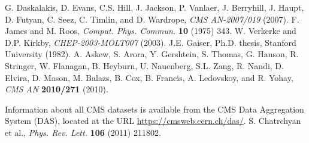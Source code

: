 \documentclass[12pt, letterpaper]{report}
\begin{document}
\begin{thebibliography}{99}
 G. Daskalakis, D. Evans, C.S. Hill, J. Jackson, P. Vanlaer, J. Berryhill, J. Haupt, D. Futyan, C. Seez, C. Timlin, and D. Wardrope, \textit{CMS AN-2007/019} (2007).
 F. James and M. Roos, \textit{Comput. Phys. Commun.} \textbf{10} (1975) 343.
 W. Verkerke and D.P. Kirkby, \textit{CHEP-2003-MOLT007} (2003).
 J.E. Gaiser, Ph.D. thesis, Stanford University (1982).
 A. Askew, S. Arora, Y. Gershtein, S. Thomas, G. Hanson, R. Stringer, W. Flanagan, B. Heyburn, U. Nauenberg, S.L. Zang, R. Nandi, D. Elvira, D. Mason, M. Balazs, B. Cox, B. Francis, A. Ledovskoy, and R. Yohay, \textit{CMS AN} \textbf{2010/271} (2010).


 Information about all CMS datasets is available from the CMS Data Aggregation System (DAS), located at the URL \url{https://cmsweb.cern.ch/das/}.
 S. Chatrchyan et al., \textit{Phys. Rev. Lett.} \textbf{106} (2011) 211802.



\end{thebibliography}
\end{document}
